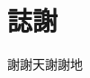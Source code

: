 \documentclass[class=NCU_thesis, crop=false]{standalone}
\begin{document}
\chapter{誌謝}

謝謝天謝謝地
\end{document}
